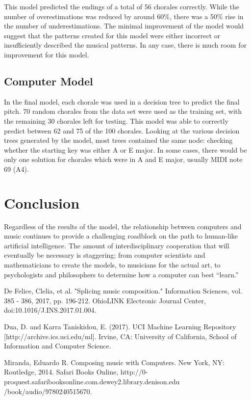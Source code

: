 \documentclass[12pt]{article}
\begin{document}
This model predicted the endings of a total of 56 chorales correctly. While the number of overestimations was reduced by around 60\%, there was a 50\% rise in the number of underestimations. The minimal improvement of the model would suggest that the patterns created for this model were either incorrect or insufficiently described the musical patterns. In any case, there is much room for improvement for this model.

\subsection{Computer Model}
In the final model, each chorale was used in a decision tree to predict the final pitch. 70 random chorales from the data set were used as the training set, with the remaining 30 chorales left for testing. This model was able to correctly predict between 62 and 75 of the 100 chorales. Looking at the various decision trees generated by the model, most trees contained the same node: checking whether the starting key was either A or E major. In some cases, there would be only one solution for chorales which were in A and E major, usually MIDI note 69 (A4). 

\section{Conclusion}
Regardless of the results of the model, the relationship between computers and music continues to provide a challenging roadblock on the path to human-like artificial intelligence. The amount of interdisciplinary cooperation that will eventually be necessary is staggering; from computer scientists and mathematicians to create the models, to musicians for the actual art, to psychologists and philosophers to determine how a computer can best ``learn.'' 

\begin{thebibliography}{10}
  De Felice, Clelia, et al. "Splicing music composition." Information Sciences, vol. 385 - 386, 2017, pp. 196-212. OhioLINK Electronic Journal Center, doi:10.1016/J.INS.2017.01.004.

  Dua, D. and Karra Taniskidou, E. (2017). UCI Machine Learning Repository [http://archive.ics.uci.edu/ml]. Irvine, CA: University of California, School of Information and Computer Science.

  Miranda, Eduardo R. Composing music with Computers. New York, NY: Routledge, 2014. Safari Books Online, http://0-proquest.safaribooksonline.com.dewey2.library.denison.edu\\/book/audio/9780240515670.
\end{thebibliography}
\end{document}
